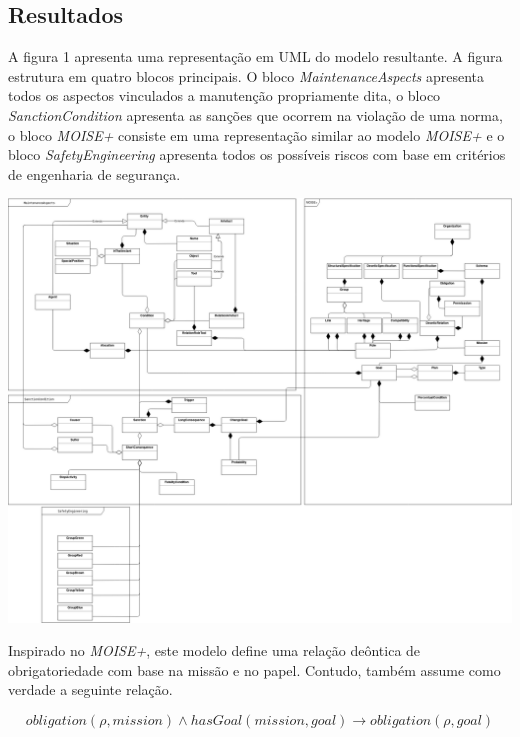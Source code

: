 \documentclass[a0,portrait]{a0poster}
\begin{document}
\begin{multicols}{2}
\section*{Resultados}

A figura 1 apresenta uma representação em UML do modelo resultante. A figura estrutura em 
quatro blocos principais. O bloco \textit{MaintenanceAspects} apresenta todos os aspectos vinculados a manutenção 
propriamente dita, o bloco \textit{SanctionCondition} apresenta as sanções que ocorrem na violação de uma norma, o 
bloco \textit{MOISE+} consiste em uma representação similar ao modelo \textit{MOISE+} e o bloco \textit{SafetyEngineering}
apresenta todos os possíveis riscos com base em critérios de engenharia de segurança.

\begin{center}\vspace{1cm} 
	\label{figUmlModelSimulation}
	\includegraphics[width=1\linewidth]{uml_model_simulation}
\end{center}\vspace{1cm} 



Inspirado no \textit{MOISE+}, este modelo define uma relação deôntica de obrigatoriedade com base na missão e no papel. 
Contudo, também assume como verdade a seguinte relação. 

\begin{equation}\label{deontilogic}
	obligation(\rho,mission)\wedge hasGoal(mission,goal) \to obligation(\rho,goal)
\end{equation}


\end{multicols}
\end{document}
